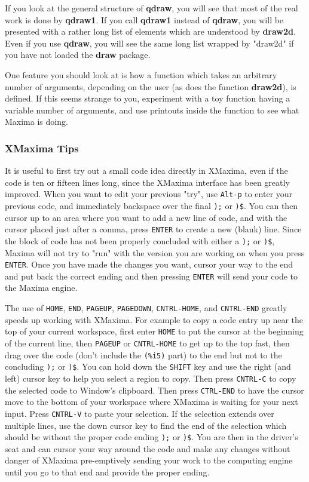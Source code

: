 \documentclass[12pt]{article}
\begin{document}
\smallskip
If you look at the general structure of \textbf{qdraw}, you will see that most of the
  real work is done by \textbf{qdraw1}. 
If you call \textbf{qdraw1} instead of \textbf{qdraw}, you will be presented with
  a rather long list of elements which are understood by \textbf{draw2d}.
Even if you use \textbf{qdraw}, you will see the same long list wrapped by "draw2d"
  if you have not loaded the \textbf{draw} package.

\smallskip
One feature you should look at is how a function which takes an arbitrary number
  of arguments, depending on the user (as does the function \textbf{draw2d}), is defined.
If this seems strange to you, experiment with a toy function having a variable
  number of arguments, and use printouts inside the function to see what Maxima is
  doing.

\newpage
\subsubsection{XMaxima Tips}
It is useful to first try out a small code idea directly in XMaxima, even if the code is
  ten or fifteen lines long, since the XMaxima interface has been greatly improved.
When you want to edit your previous "try", use \verb|Alt-p| to enter your previous
  code, and immediately backspace over the final \verb|);| or \verb|)$|.
You can then cursor up to an area where you want to add a new line of code,
  and with the cursor placed just after a comma, press \verb|ENTER| to create
  a new (blank) line.
Since the block of code has not been properly concluded with either a \verb|);|
  or \verb|)$|, Maxima will not try to "run" with the version you are working
  on when you press \verb|ENTER|.
Once you have made the changes you want, cursor your way to the end and put back
  the correct ending and then pressing \verb|ENTER| will send your code to the 
   Maxima engine.  

\smallskip
The use of \verb|HOME|, \verb|END|, \verb|PAGEUP|, \verb|PAGEDOWN|, \verb|CNTRL-HOME|, and
  \verb|CNTRL-END| greatly speeds up working with XMaxima.
For example to copy a code entry up near the top of your current workspace,
  first enter \verb|HOME| to put the cursor at the beginning of the current
  line, then \verb|PAGEUP| or \verb|CNTRL-HOME| to get up to the top fast,
  then drag over the code (don't include the \verb|(%i5)| part) to the
  end but not to the concluding \verb|);| or \verb|)$|.
You can hold down the \verb|SHIFT| key and use the right (and left) cursor key to
  help you select a region to copy.
Then press \verb|CNTRL-C| to copy the selected code to Window's clipboard.
Then press \verb|CTRL-END| to have the cursor move to the bottom of your workspace
  where XMaxima is waiting for your next input.
Press \verb|CNTRL-V| to paste your selection.
If the selection extends over multiple lines, use the down cursor key to find
  the end of the selection which should be without the proper code ending \verb|);|
  or \verb|)$|.
You are then in the driver's seat and can cursor your way around the code and make
  any changes without danger of XMaxima pre-emptively sending your work to the
  computing engine until you go to that end and provide the proper ending.  
\end{document}
